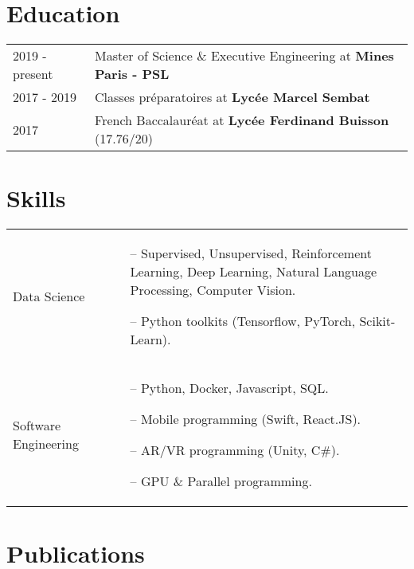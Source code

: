 \documentclass[a4paper,12pt]{article}
\begin{document}
\section{Education}
\begin{tabularx}{\linewidth}{@{}l X@{}}	
2019 - present & Master of Science \& Executive Engineering  at \textbf{Mines Paris - PSL} %
\\
2017 - 2019 & Classes préparatoires at \textbf{Lycée Marcel Sembat} %
\\ 
2017 & French Baccalauréat at \textbf{Lycée Ferdinand Buisson} \hfill  (17.76/20) \\
\end{tabularx}
\section{Skills}
\begin{tabularx}{\linewidth}{@{}l X@{}}
Data Science &  \normalsize{
\begin{minipage}[t]{\linewidth}
    \begin{itemize}[nosep,after=\strut, leftmargin=1em, itemsep=3pt]
    \item[--]Supervised, Unsupervised, Reinforcement Learning, Deep Learning, Natural Language Processing, Computer Vision.
    \item[--]Python toolkits (Tensorflow, PyTorch, Scikit-Learn). 
    \end{itemize}
    \end{minipage}}
\\
Software Engineering  &  \normalsize{
\begin{minipage}[t]{\linewidth}
    \begin{itemize}[nosep,after=\strut, leftmargin=1em, itemsep=3pt]
    \item[--]Python, Docker, Javascript, SQL.
    \item[--]Mobile programming (Swift, React.JS). 
    \item[--]AR/VR programming (Unity, C\#).
    \item[--] GPU \& Parallel programming.
    \end{itemize}
    \end{minipage}}
\\
\end{tabularx}
\section{Publications}
\begin{refsection}
\nocite{*}
\printbibliography[heading=none]
\end{refsection}
\vfill
{}
\end{document}
